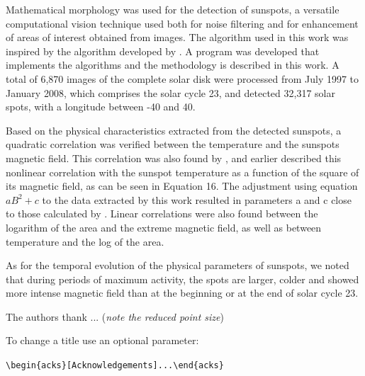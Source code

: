 \documentclass[namedreferences]{solarphysics}
\begin{document}
\begin{article}
Mathematical morphology was used for the detection of sunspots,
a versatile computational vision technique used both for noise filtering and for enhancement of areas of interest obtained from images.
The algorithm used in this work was inspired by the algorithm developed by \citealp{curto2008}.
A program was developed that implements the algorithms and the methodology is described in this work. 
A total of 6,870 images of the complete solar disk were processed from July 1997 to January 2008, 
which comprises the solar cycle 23,
and detected 32,317 solar spots, with a longitude between -40 and 40.

Based on the physical characteristics extracted from the detected sunspots,
a quadratic correlation was verified between the temperature and the sunspots magnetic field. 
This correlation was also found by \citealp{Kopp1992}, 
and earlier \citealp{Dicke1970} described this nonlinear correlation with the sunspot temperature as a function of the square of its magnetic field,
as can be seen in Equation 16. The adjustment using equation $aB^2 + c $ to the data extracted by this work resulted in parameters a and c close to those calculated by \citealp{Dicke1970}.
Linear correlations were also found between the logarithm of the area and the extreme magnetic field, 
as well as between temperature and the log of the area.

As for the temporal evolution of the physical parameters of sunspots, we noted that during periods of maximum activity,
the spots are larger, colder and showed more intense magnetic field than at the beginning or at the end of solar cycle 23.

\begin{acks}
 The authors thank ... ({\it note the reduced point size})
\end{acks}

\noindent To change a title use an optional parameter:\par
\verb+\begin{acks}[Acknowledgements]...\end{acks}+





  


\end{article}
\end{document}
